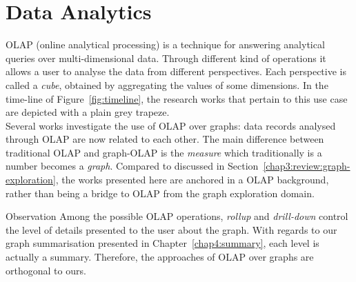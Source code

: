 
\section{Data Analytics}
\label{chap3:review:data-analytics}

OLAP (online analytical processing) is a technique for answering analytical queries over multi-dimensional data. Through different kind of operations it allows a user to analyse the data from different perspectives. Each perspective is called a \emph{cube}, obtained by aggregating the values of some dimensions. In the time-line of Figure~\ref{fig:timeline}, the research works that pertain to this use case are depicted with a plain grey trapeze.\\

Several works investigate the use of OLAP over graphs: data records analysed through OLAP are now related to each other. The main difference between traditional OLAP and graph-OLAP is the \emph{measure} which traditionally is a number becomes a \emph{graph}. Compared to \cite{tian:sigmod:2008} discussed in Section~\ref{chap3:review:graph-exploration}, the works presented here are anchored in a OLAP background, rather than being a bridge to OLAP from the graph exploration domain.

\begin{centeremph}{Observation}
	Among the possible OLAP operations, \emph{rollup} and \emph{drill-down} control the level of details presented to the user about the graph. With regards to our graph summarisation presented in Chapter~\ref{chap4:summary}, each level is actually a summary. Therefore, the approaches of OLAP over graphs are orthogonal to ours.
\end{centeremph}


